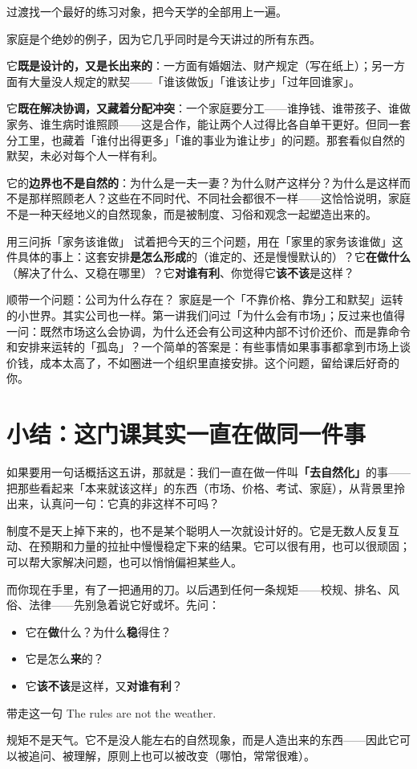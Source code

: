 \documentclass[10pt,a4paper]{ctexart}
\newcommand{\transitionnote}[1]{%
  \begin{conceptbox}{过渡}#1\end{conceptbox}%
}
\begin{document}
\transitionnote{找一个最好的练习对象，把今天学的全部用上一遍。}

家庭是个绝妙的例子，因为它几乎同时是今天讲过的所有东西。

它\textbf{既是设计的，又是长出来的}：一方面有婚姻法、财产规定（写在纸上）；另一方面有大量没人规定的默契——「谁该做饭」「谁该让步」「过年回谁家」。

它\textbf{既在解决协调，又藏着分配冲突}：一个家庭要分工——谁挣钱、谁带孩子、谁做家务、谁生病时谁照顾——这是合作，能让两个人过得比各自单干更好。但同一套分工里，也藏着「谁付出得更多」「谁的事业为谁让步」的问题。那套看似自然的默契，未必对每个人一样有利。

它的\textbf{边界也不是自然的}：为什么是一夫一妻？为什么财产这样分？为什么是这样而不是那样照顾老人？这些在不同时代、不同社会都很不一样——这恰恰说明，家庭不是一种天经地义的自然现象，而是被制度、习俗和观念一起塑造出来的。

\begin{discussionbox}{用三问拆「家务该谁做」}
试着把今天的三个问题，用在「家里的家务该谁做」这件具体的事上：这套安排\textbf{是怎么形成}的（谁定的、还是慢慢默认的）？它\textbf{在做什么}（解决了什么、又稳在哪里）？它\textbf{对谁有利}、你觉得它\textbf{该不该}是这样？
\end{discussionbox}

\begin{conceptbox}{顺带一个问题：公司为什么存在？}
家庭是一个「不靠价格、靠分工和默契」运转的小世界。其实公司也一样。第一讲我们问过「为什么会有市场」；反过来也值得一问：既然市场这么会协调，为什么还会有公司这种内部不讨价还价、而是靠命令和安排来运转的「孤岛」？一个简单的答案是：有些事情如果事事都拿到市场上谈价钱，成本太高了，不如圈进一个组织里直接安排。这个问题，留给课后好奇的你。
\end{conceptbox}

\section{小结：这门课其实一直在做同一件事}

如果要用一句话概括这五讲，那就是：我们一直在做一件叫\textbf{「去自然化」}的事——把那些看起来「本来就该这样」的东西（市场、价格、考试、家庭），从背景里拎出来，认真问一句：它真的非这样不可吗？

制度不是天上掉下来的，也不是某个聪明人一次就设计好的。它是无数人反复互动、在预期和力量的拉扯中慢慢稳定下来的结果。它可以很有用，也可以很顽固；可以帮大家解决问题，也可以悄悄偏袒某些人。

而你现在手里，有了一把通用的刀。以后遇到任何一条规矩——校规、排名、风俗、法律——先别急着说它好或坏。先问：

\begin{itemize}
  \item 它在\textbf{做}什么？为什么\textbf{稳}得住？
  \item 它是怎么\textbf{来}的？
  \item 它\textbf{该不该}是这样，又\textbf{对谁有利}？
\end{itemize}

\begin{insightbox}{带走这一句}
The rules are not the weather.

规矩不是天气。它不是没人能左右的自然现象，而是人造出来的东西——因此它可以被追问、被理解，原则上也可以被改变（哪怕，常常很难）。
\end{insightbox}
\end{document}
